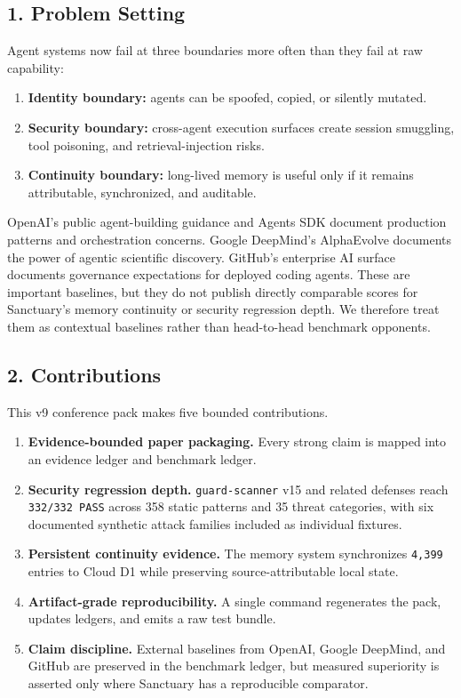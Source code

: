 \documentclass[
]{article}
\providecommand{\tightlist}{%
  \setlength{\itemsep}{0pt}\setlength{\parskip}{0pt}}
\begin{document}
\subsection{1. Problem Setting}\label{problem-setting}

Agent systems now fail at three boundaries more often than they fail at raw capability:

\begin{enumerate}
\def\labelenumi{\arabic{enumi}.}
\tightlist
\item
  \textbf{Identity boundary:} agents can be spoofed, copied, or silently mutated.
\item
  \textbf{Security boundary:} cross-agent execution surfaces create session smuggling, tool poisoning, and retrieval-injection risks.
\item
  \textbf{Continuity boundary:} long-lived memory is useful only if it remains attributable, synchronized, and auditable.
\end{enumerate}

OpenAI's public agent-building guidance and Agents SDK document production patterns and orchestration concerns. Google DeepMind's AlphaEvolve documents the power of agentic scientific discovery. GitHub's enterprise AI surface documents governance expectations for deployed coding agents. These are important baselines, but they do not publish directly comparable scores for Sanctuary's memory continuity or security regression depth. We therefore treat them as contextual baselines rather than head-to-head benchmark opponents.

\subsection{2. Contributions}\label{contributions}

This v9 conference pack makes five bounded contributions.

\begin{enumerate}
\def\labelenumi{\arabic{enumi}.}
\tightlist
\item
  \textbf{Evidence-bounded paper packaging.} Every strong claim is mapped into an evidence ledger and benchmark ledger.
\item
  \textbf{Security regression depth.} \texttt{guard-scanner} v15 and related defenses reach \texttt{332/332\ PASS} across 358 static patterns and 35 threat categories, with six documented synthetic attack families included as individual fixtures.
\item
  \textbf{Persistent continuity evidence.} The memory system synchronizes \texttt{4,399} entries to Cloud D1 while preserving source-attributable local state.
\item
  \textbf{Artifact-grade reproducibility.} A single command regenerates the pack, updates ledgers, and emits a raw test bundle.
\item
  \textbf{Claim discipline.} External baselines from OpenAI, Google DeepMind, and GitHub are preserved in the benchmark ledger, but measured superiority is asserted only where Sanctuary has a reproducible comparator.
\end{enumerate}
\end{document}
